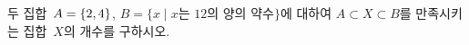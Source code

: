두 집합~$A=\{2{,}\mkern3mu\mathopen{}4\}$, $B=\{x \mid x$는 $12$의 양의 약수$\}$에 대하여 $A\subset X\subset B$를 만족시키는 집합~$X$의 개수를 구하시오.
